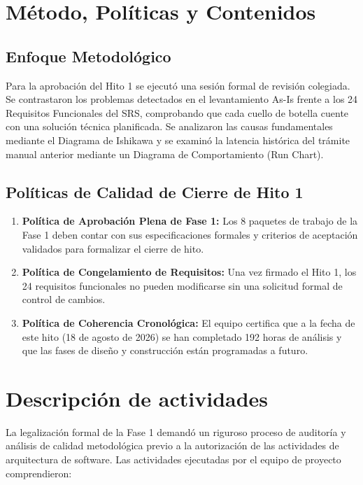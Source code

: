 \documentclass[12pt,a4paper]{article}
\begin{document}
\section{Método, Políticas y Contenidos}
\subsection{Enfoque Metodológico}
Para la aprobación del Hito 1 se ejecutó una sesión formal de revisión colegiada. Se contrastaron los problemas detectados en el levantamiento As-Is frente a los 24 Requisitos Funcionales del SRS, comprobando que cada cuello de botella cuente con una solución técnica planificada. Se analizaron las causas fundamentales mediante el Diagrama de Ishikawa y se examinó la latencia histórica del trámite manual anterior mediante un Diagrama de Comportamiento (Run Chart).

\subsection{Políticas de Calidad de Cierre de Hito 1}
\begin{enumerate}[leftmargin=1.5em, itemsep=2pt]
    \item \textbf{Política de Aprobación Plena de Fase 1:} Los 8 paquetes de trabajo de la Fase 1 deben contar con sus especificaciones formales y criterios de aceptación validados para formalizar el cierre de hito.
    \item \textbf{Política de Congelamiento de Requisitos:} Una vez firmado el Hito 1, los 24 requisitos funcionales no pueden modificarse sin una solicitud formal de control de cambios.
    \item \textbf{Política de Coherencia Cronológica:} El equipo certifica que a la fecha de este hito (18 de agosto de 2026) se han completado 192 horas de análisis y que las fases de diseño y construcción están programadas a futuro.
\end{enumerate}

\section{Descripción de actividades}
La legalización formal de la Fase 1 demandó un riguroso proceso de auditoría y análisis de calidad metodológica previo a la autorización de las actividades de arquitectura de software. Las actividades ejecutadas por el equipo de proyecto comprendieron:
\end{document}
